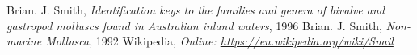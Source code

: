 \documentclass[twoside]{article}
\begin{document}
\setlength{\parskip}{0pt}

\printnoidxglossary[style=listdotted]

\begin{thebibliography}{8}
     Brian. J. Smith, \emph{Identification keys to the families and genera of bivalve and gastropod molluscs found in Australian inland waters}, 1996
     Brian. J. Smith, \emph{Non-marine Mollusca}, 1992
     Wikipedia, \emph{Online: \url{https://en.wikipedia.org/wiki/Snail}}

\end{thebibliography}
\end{document}
